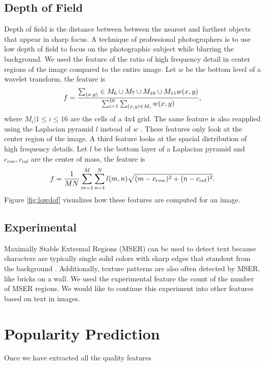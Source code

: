 \documentclass[conference,a4paper]{IEEEtran}
\begin{document}
  \subsection{Depth of Field}
  Depth of field is the distance between between the nearest and farthest objects that appear in sharp focus.  A technique of professional photographers is to use low depth of field to focus on the photographic subject while blurring the background.  We used the feature \cite{datta2006studying} of the ratio of high frequency detail in center regions of the image compared to the entire image.  Let $w$ be the bottom level of a wavelet transform, the feature is
  \begin{equation}
    f ={\sum_{(x,y)}\in M_6\cup M_7\cup M_{10}\cup M_{11} w(x,y) \over \sum_{i=1}^{16}\sum_{(x,y)\in M_i} w(x,y)} ,
  \end{equation}
  where $M_i | 1 \le i \le 16$ are the cells of a 4x4 grid.  The same feature is also reapplied using the Laplacian pyramid $l$ instead of $w$ \cite{wang2015automatic}.  These features only look at the center region of the image.  A third feature \cite{wang2015automatic} looks at the spacial distribution of high frequency details.  Let $l$ be the bottom layer of a Laplacian pyramid and $c_{row}, c_{col}$ are the center of mass, the feature is
  \begin{equation} 
    f = {1 \over MN} \sum_{m=1}^M\sum_{n=1}^N l(m,n)\sqrt{(m-c_{row})^2 + (n-c_{col})^2} .
  \end{equation}
  Figure \ref{fig:lowdof} visualizes how these features are computed for an image.

  \subsection{Experimental}
  Maximally Stable Extremal Regions (MSER) \cite{matas2004robust} can be used to detect text because characters are typically single solid colors with sharp edges that standout from the background \cite{chen2011robust}.  Additionally, texture patterns are also often detected by MSER, like bricks on a wall.  We used the experimental feature the count of the number of MSER regions.  We would like to continue this experiment into other features based on text in images.
 
\section{Popularity Prediction}
\label{sec:experiments}
Once we have extracted all the quality features
\end{document}

